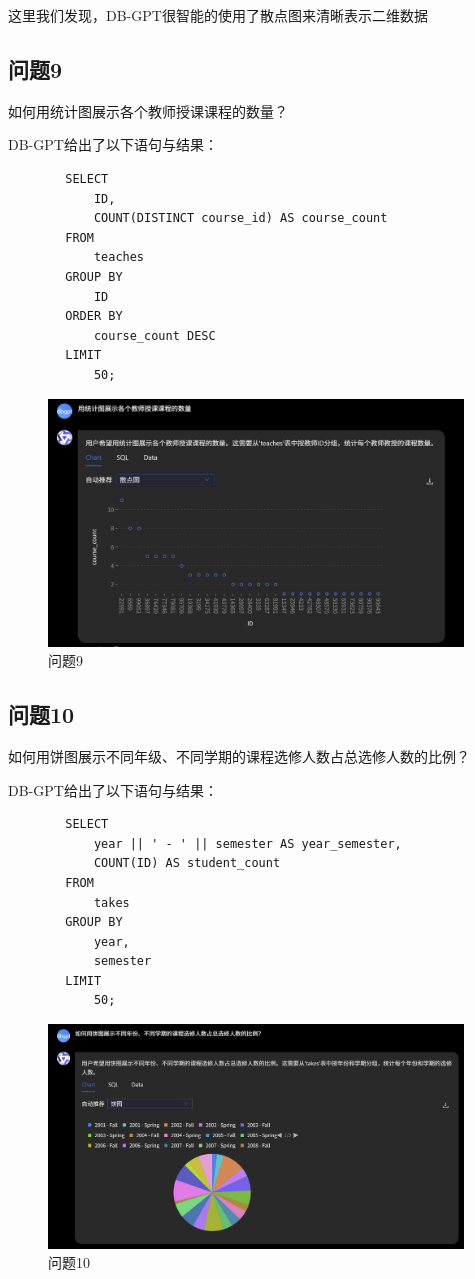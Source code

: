 \documentclass{article}
\begin{document}
	这里我们发现，DB-GPT很智能的使用了散点图来清晰表示二维数据
	
	\subsection{问题9}
	如何用统计图展示各个教师授课课程的数量？
	
	DB-GPT给出了以下语句与结果：
	
	\begin{verbatim}
		SELECT
			ID,
			COUNT(DISTINCT course_id) AS course_count
		FROM
			teaches
		GROUP BY
			ID
		ORDER BY
			course_count DESC
		LIMIT
			50;
	\end{verbatim}
	
	\begin{figure}[H]
		\centering
		\includegraphics[width=11cm]{./images/31.问题9.png}
		\caption{问题9}
	\end{figure}
	
	\subsection{问题10}
	如何用饼图展示不同年级、不同学期的课程选修人数占总选修人数的比例？
	
	DB-GPT给出了以下语句与结果：
	
	\begin{verbatim}
		SELECT
			year || ' - ' || semester AS year_semester,
			COUNT(ID) AS student_count
		FROM
			takes
		GROUP BY
			year,
			semester
		LIMIT
			50;
	\end{verbatim}
	
	\begin{figure}[H]
		\centering
		\includegraphics[width=11cm]{./images/32.问题10.png}
		\caption{问题10}
	\end{figure}
	
\end{document}
